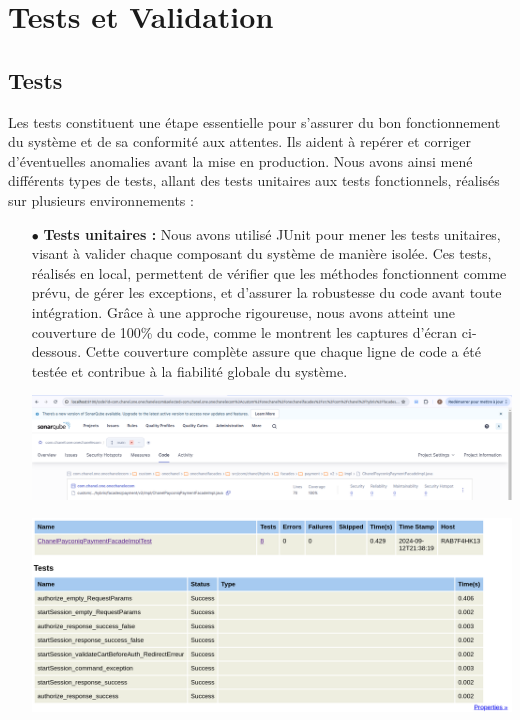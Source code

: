 \section{Tests et Validation}
\subsection{Tests}
Les tests constituent une étape essentielle pour s'assurer du bon fonctionnement du système et de sa conformité aux attentes. Ils aident à repérer et corriger d'éventuelles anomalies avant la mise en production. Nous avons ainsi mené différents types de tests, allant des tests unitaires aux tests fonctionnels, réalisés sur plusieurs environnements :
\begin{itemize}
    \item[$\bullet$] \textbf{Tests unitaires :} Nous avons utilisé JUnit pour mener les tests unitaires, visant à valider chaque composant du système de manière isolée. Ces tests, réalisés en local, permettent de vérifier que les méthodes fonctionnent comme prévu, de gérer les exceptions, et d’assurer la robustesse du code avant toute intégration. Grâce à une approche rigoureuse, nous avons atteint une couverture de 100\% du code, comme le montrent les captures d'écran ci-dessous. Cette couverture complète assure que chaque ligne de code a été testée et contribue à la fiabilité globale du système.
    \begin{center}
        \centering
        \includegraphics[width=18cm]{Figures/Screens/couvrage.png}
        \label{fig:couvrage}
    \end{center}
    \begin{center}
        \centering
        \includegraphics[width=18cm]{Figures/Screens/reportSonar.png}

\end{center}
\end{itemize}
